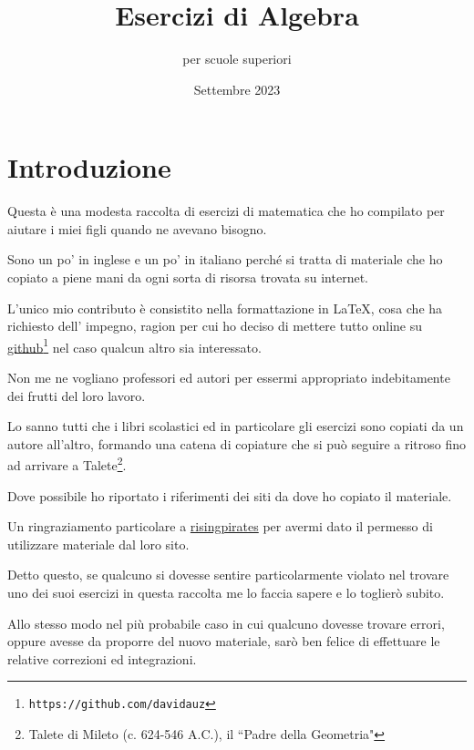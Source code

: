 \documentclass[a4paper,14pt]{extarticle}
\title{Esercizi di Algebra}
\author{per scuole superiori}
\date{Settembre 2023}
\begin{document}
\maketitle
\tableofcontents
\newpage

\section{Introduzione}

Questa è una modesta raccolta di esercizi di matematica che ho 
compilato per aiutare i miei figli quando ne avevano bisogno.

Sono un po' in inglese e un po' in italiano perché
si tratta di materiale che ho copiato a piene mani da ogni 
sorta di risorsa trovata su internet.

L'unico mio contributo è consistito nella formattazione in  \LaTeX, cosa che ha richiesto 
dell' impegno, ragion per cui ho deciso di mettere tutto online su \href{https://github.com/davidauz}{github}\footnote{\texttt{https://github.com/davidauz}}
nel caso qualcun altro sia interessato.

Non me ne vogliano professori ed autori per essermi appropriato indebitamente dei frutti del loro lavoro.

Lo sanno tutti che i libri scolastici ed in particolare gli esercizi sono copiati da un autore 
all'altro, formando una catena di copiature che si può seguire a ritroso fino ad arrivare a 
Talete\footnote{Talete di Mileto (c. 624-546 A.C.), il ``Padre della Geometria"}.

Dove possibile ho riportato i riferimenti dei siti da dove ho copiato il materiale.

Un ringraziamento particolare a \href{https://www.risingpirates.com}{risingpirates} per avermi dato il permesso di
utilizzare materiale dal loro sito.

Detto questo, se qualcuno si dovesse sentire particolarmente violato nel trovare uno dei 
suoi esercizi in questa raccolta me lo faccia sapere e lo toglierò subito.

Allo stesso modo nel più probabile caso in cui qualcuno dovesse trovare errori, oppure avesse da 
proporre del nuovo materiale, sarò ben felice di effettuare le relative correzioni ed integrazioni.


















\end{document}
